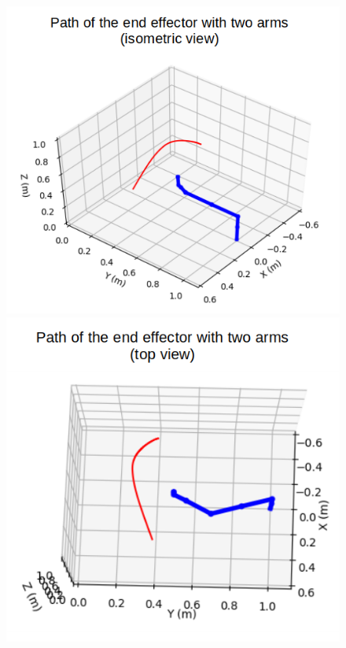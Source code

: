 \documentclass[a4paper, 10pt, conference]{ieeeconf}      %
\begin{document}
\begin{figure}[H]
	\centering
	\includegraphics[scale=0.25]{images/two_arms.png}
	\includegraphics[scale=0.25]{images/two_arms_top.png}

\end{figure}
\end{document}
